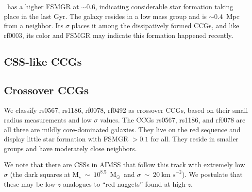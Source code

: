\documentclass[iop,apj]{emulateapj}
\newcommand{\Msun}{M$_{\odot}$}
\begin{document}
\ has a higher FSMGR at $\sim0.6$, indicating considerable star formation taking place in the last Gyr. The galaxy resides in a low mass group and is $\sim0.4$~Mpc from a neighbor. Its $\sigma$ places it among the dissipatively formed CCGs, and like rf0003, its color and FSMGR may indicate this formation happened recently.

\subsection{CSS-like CCGs}


\subsection{Crossover CCGs}
We classify rs0567, rs1186, rf0078, rf0492 as crossover CCGs, based on their small radius measurements and low $\sigma$ values. The CCGs rs0567, rs1186, and rf0078 are all three are mildly core-dominated galaxies. They live on the red sequence and display little star formation with FSMGR $> 0.1$ for all. They reside in smaller groups and have moderately close neighbors.

We note that there are CSSs in AIMSS that follow this track with extremely low $\sigma$ (the dark squares at M$_{\star}~\sim~10^{8.5}$~\Msun\ and $\sigma~\sim~20~\text{km~s}^{-2}$). We postulate that these may be low-$z$ analogues to ``red nuggets'' found at high-$z$. 
\end{document}
